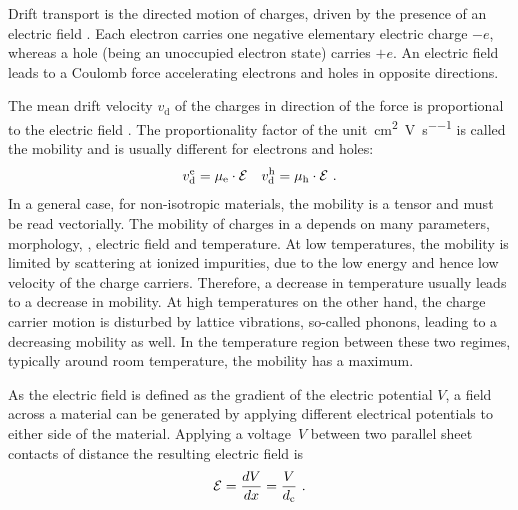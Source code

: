 Drift transport is the directed motion of charges, driven by the presence of an electric field \EField. Each electron carries one negative elementary electric charge $-e$, whereas a hole (being an unoccupied electron state) carries $+e$.
An electric field leads to a Coulomb%
force accelerating electrons and holes in opposite directions.

The mean drift velocity $v_\text{d}$ of the charges in direction of the force is proportional to the electric field \EField. The proportionality factor of the unit~\si[per=frac]{\centi\meter\squared\per\volt\per\second} is called the mobility \mob and is usually different for electrons and holes:
\begin{align}
 v_\text{d}^\text{e} = \mobe \cdot \EField & & v_\text{d}^\text{h} = \mobh \cdot \EField \label{eq:vdrift}
\PUNKT
\end{align}
In a general case, \eg for non-isotropic materials, the mobility is a tensor and \lasteqn must be read vectorially. The mobility of charges in a \SC depends on many parameters, \eg morphology, \nLong, electric field and temperature. At low temperatures, the mobility is limited by scattering at ionized impurities, due to the low energy and hence low velocity of the charge carriers. Therefore, a decrease in temperature usually leads to a decrease in mobility. At high temperatures on the other hand, the charge carrier motion is disturbed by lattice vibrations, so-called phonons, leading to a decreasing mobility as well. In the temperature region between these two regimes, typically around room temperature, the mobility has a maximum.

As the electric field \EField is defined as the gradient of the electric potential $V$, a field across a material can be generated by applying different electrical potentials to either side of the material.
Applying a voltage~$V$ between two parallel sheet contacts of distance \dc the resulting electric field \EField is
\begin{equation}\label{eq:Efield}
\mathcal{E} = \frac{dV}{dx} = \frac{V}{d_\text{c}}
~.
\end{equation}

